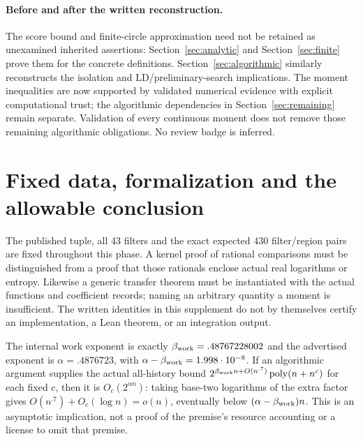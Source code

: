 \documentclass[11pt]{article}
\begin{document}
\paragraph{Before and after the written reconstruction.}
The score bound and finite-circle approximation need not be retained
as unexamined inherited assertions: Section~\ref{sec:analytic} and
Section~\ref{sec:finite} prove them for the concrete definitions.
Section~\ref{sec:algorithmic} similarly reconstructs the isolation and
LD/preliminary-search implications. The moment inequalities are now
supported by validated numerical evidence with explicit computational
trust; the algorithmic dependencies in Section~\ref{sec:remaining}
remain separate. Validation of every continuous moment does not remove
those remaining algorithmic obligations. No review badge is inferred.







\section{Fixed data, formalization and the allowable conclusion}
The published tuple, all 43 filters and the exact expected 430
filter/region pairs are fixed throughout this phase. A kernel proof of
rational comparisons must be distinguished from a proof that those
rationals enclose actual real logarithms or entropy. Likewise a generic
transfer theorem must be instantiated with the actual functions and
coefficient records; naming an arbitrary quantity a moment is insufficient.
The written identities in this supplement do not by themselves certify
an implementation, a Lean theorem, or an integration output.

The internal work exponent is exactly $\beta_{\rm work}=.48767228002$ and the
advertised exponent is $\alpha=.4876723$, with
$\alpha-\beta_{\rm work}=1.998\cdot10^{-8}$. If an algorithmic argument supplies
the actual all-history bound
$2^{\beta_{\rm work}n+O(n^{.7})}\operatorname{poly}(n+n^c)$ for each fixed $c$,
then it is $O_c(2^{\alpha n})$: taking base-two logarithms of the extra
factor gives $O(n^{.7})+O_c(\log n)=o(n)$, eventually below
$(\alpha-\beta_{\rm work})n$. This is an asymptotic implication, not a proof of
the premise's resource accounting or a license to omit that premise.
\end{document}

